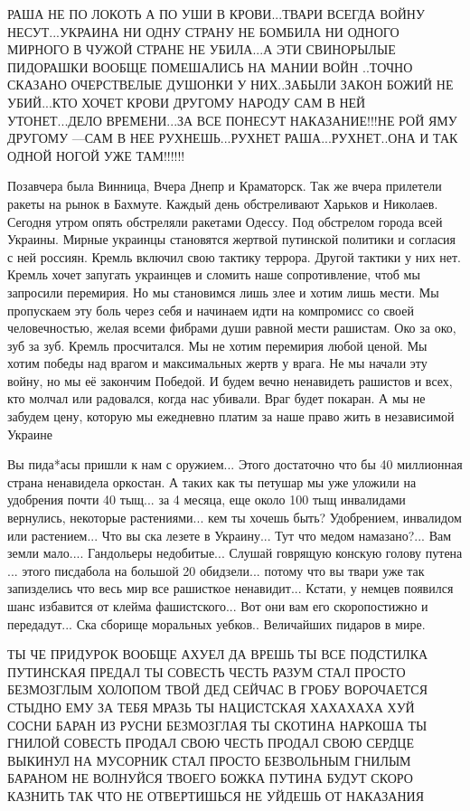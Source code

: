 РАША НЕ ПО ЛОКОТЬ А ПО УШИ В КРОВИ...ТВАРИ ВСЕГДА ВОЙНУ НЕСУТ...УКРАИНА НИ ОДНУ
СТРАНУ НЕ БОМБИЛА НИ ОДНОГО МИРНОГО В ЧУЖОЙ СТРАНЕ НЕ УБИЛА...А ЭТИ СВИНОРЫЛЫЕ
ПИДОРАШКИ ВООБЩЕ ПОМЕШАЛИСЬ НА МАНИИ ВОЙН ..ТОЧНО СКАЗАНО ОЧЕРСТВЕЛЫЕ ДУШОНКИ У
НИХ..ЗАБЫЛИ ЗАКОН БОЖИЙ НЕ УБИЙ...КТО ХОЧЕТ КРОВИ ДРУГОМУ НАРОДУ САМ В НЕЙ
УТОНЕТ...ДЕЛО ВРЕМЕНИ...ЗА ВСЕ ПОНЕСУТ НАКАЗАНИЕ!!!НЕ РОЙ ЯМУ ДРУГОМУ ---САМ В
НЕЕ РУХНЕШЬ...РУХНЕТ РАША...РУХНЕТ..ОНА И ТАК ОДНОЙ НОГОЙ УЖЕ ТАМ!!!!!!

Позавчера была Винница, Вчера Днепр и Краматорск. Так же вчера прилетели ракеты
на рынок в Бахмуте. Каждый день обстреливают Харьков и Николаев. Сегодня утром
опять обстреляли ракетами Одессу. Под обстрелом города всей Украины. Мирные
украинцы становятся жертвой путинской политики и согласия с ней россиян. Кремль
включил свою тактику террора. Другой тактики у них нет. Кремль хочет запугать
украинцев и сломить наше сопротивление, чтоб мы запросили перемирия. Но мы
становимся лишь злее и хотим лишь мести. Мы пропускаем эту боль через себя и
начинаем идти на компромисс со своей человечностью, желая всеми фибрами души
равной мести рашистам. Око за око, зуб за зуб. Кремль просчитался. Мы не хотим
перемирия любой ценой. Мы хотим победы над врагом и максимальных жертв у врага.
Не мы начали эту войну, но мы её закончим Победой. И будем вечно ненавидеть
рашистов и всех, кто молчал или радовался, когда нас убивали. Враг будет
покаран. А мы не забудем цену, которую мы ежедневно платим за наше право жить в
независимой Украине

Вы пида*асы пришли к нам с оружием... Этого достаточно что бы 40 миллионная
страна ненавидела оркостан. А таких как ты петушар мы уже уложили на удобрения
почти 40 тыщ... за 4 месяца, еще около 100 тыщ инвалидами вернулись, некоторые
растениями... кем ты хочешь быть? Удобрением, инвалидом или растением... Что вы
ска лезете в Украину... Тут что медом намазано?... Вам земли мало....
Гандольеры недобитые... Слушай говрящую конскую голову путена ... этого
писдабола на большой 20 обидзели... потому что вы твари уже так запизделись что
весь мир все рашисткое ненавидит... Кстати, у немцев появился шанс избавится от
клейма фашистского... Вот они вам его скоропостижно и передадут... Ска сборище
моральных уебков.. Величайших пидаров в мире.

ТЫ ЧЕ ПРИДУРОК ВООБЩЕ АХУЕЛ ДА ВРЕШЬ ТЫ ВСЕ ПОДСТИЛКА ПУТИНСКАЯ ПРЕДАЛ ТЫ
СОВЕСТЬ ЧЕСТЬ РАЗУМ СТАЛ ПРОСТО БЕЗМОЗГЛЫМ ХОЛОПОМ ТВОЙ ДЕД СЕЙЧАС В ГРОБУ
ВОРОЧАЕТСЯ СТЫДНО ЕМУ ЗА ТЕБЯ МРАЗЬ ТЫ НАЦИСТСКАЯ ХАХАХАХА ХУЙ СОСНИ БАРАН ИЗ
РУСНИ БЕЗМОЗГЛАЯ ТЫ СКОТИНА НАРКОША ТЫ ГНИЛОЙ СОВЕСТЬ ПРОДАЛ СВОЮ ЧЕСТЬ ПРОДАЛ
СВОЮ СЕРДЦЕ ВЫКИНУЛ НА МУСОРНИК СТАЛ ПРОСТО БЕЗВОЛЬНЫМ ГНИЛЫМ БАРАНОМ НЕ
ВОЛНУЙСЯ ТВОЕГО БОЖКА ПУТИНА БУДУТ СКОРО КАЗНИТЬ ТАК ЧТО НЕ ОТВЕРТИШЬСЯ НЕ
УЙДЕШЬ ОТ НАКАЗАНИЯ

